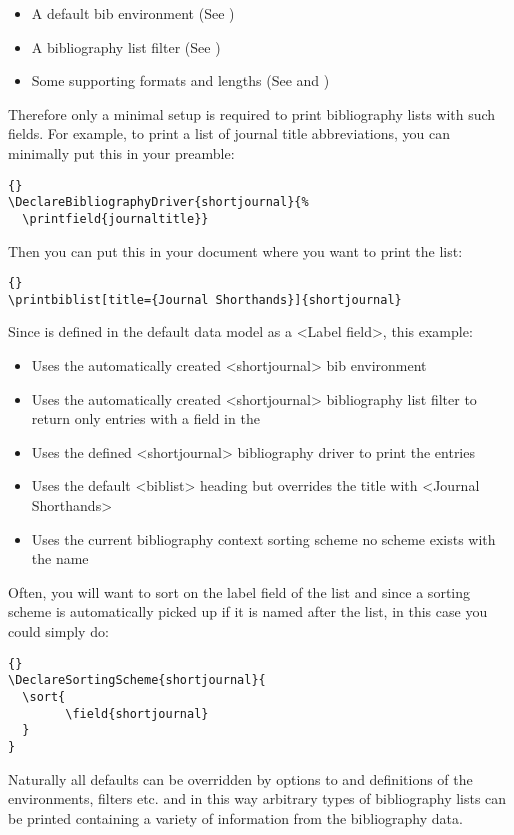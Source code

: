 \begin{ltxsyntax}
\begin{itemize}
\item A default bib environment (See )
\item A bibliography list filter (See )
\item Some supporting formats and lengths (See  and )
\end{itemize}
%
Therefore only a minimal setup is required to print bibliography lists with such fields. For example, to print a list of journal title abbreviations, you can minimally put this in your preamble:

\begin{lstlisting}[style=latex]{}
\DeclareBibliographyDriver{shortjournal}{%
  \printfield{journaltitle}}
\end{lstlisting}
%
Then you can put this in your document where you want to print the list:

\begin{lstlisting}[style=latex]{}
\printbiblist[title={Journal Shorthands}]{shortjournal}
\end{lstlisting}
%
Since  is defined in the default data model as a <Label field>, this example:
\begin{itemize}
\item Uses the automatically created <shortjournal> bib environment
\item Uses the automatically created <shortjournal> bibliography list filter to return only entries with a  field in the 
\item Uses the defined <shortjournal> bibliography driver to print the entries
\item Uses the default <biblist> heading but overrides the title with <Journal Shorthands>
\item Uses the current bibliography context sorting scheme no scheme exists with the name 
\end{itemize}
%
Often, you will want to sort on the label field of the list and since a sorting scheme is automatically picked up if it is named after the list, in this case you could simply do:

\begin{lstlisting}[style=latex]{}
\DeclareSortingScheme{shortjournal}{
  \sort{
        \field{shortjournal}
  }
}
\end{lstlisting}

Naturally all defaults can be overridden by options to  and definitions of the environments, filters etc. and in this way arbitrary types of bibliography lists can be printed containing a variety of information from the bibliography data.
\end{ltxsyntax}

